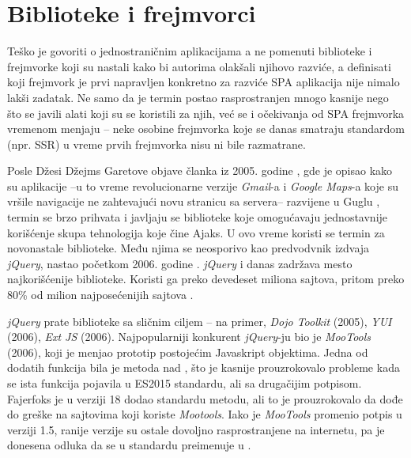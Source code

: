 \section{Biblioteke i frejmvorci}

Teško je govoriti o jednostraničnim aplikacijama a ne pomenuti biblioteke i frejmvorke koji su nastali kako bi autorima olakšali njihovo razviće, a definisati koji frejmvork je prvi napravljen konkretno za razviće SPA aplikacija nije nimalo lakši zadatak.
Ne samo da je termin  postao rasprostranjen mnogo kasnije nego što se javili alati koji su se koristili za njih, već se i očekivanja od SPA frejmvorka vremenom menjaju -- neke osobine frejmvorka koje se danas smatraju standardom (npr. SSR) u vreme prvih frejmvorka nisu ni bile razmatrane.

Posle Džesi Džejms Garetove objave članka iz 2005. godine \cite{ajax-a-new-approach}, gde je opisao kako su aplikacije --u to vreme revolucionarne verzije \textsl{Gmail}-a i \textsl{Google Maps}-a koje su vršile navigacije ne zahtevajući novu stranicu sa servera-- razvijene u Guglu \cite{aaronsw:ajax-history}, termin  se brzo prihvata i javljaju se biblioteke koje omogućavaju jednostavnije korišćenje skupa tehnologija koje čine Ajaks.
U ovo vreme koristi se termin  za novonastale biblioteke.
Među njima se neosporivo kao predvodvnik izdvaja \textsl{jQuery}, nastao početkom 2006. godine \cite{vincent:short-history}.
\textsl{jQuery} i danas zadržava mesto najkorišćenije biblioteke.
Koristi ga preko devedeset miliona sajtova, pritom preko 80\% od milion najposećenijih sajtova \cite{built-with-jquery}.

\textsl{jQuery} prate biblioteke sa sličnim ciljem -- na primer, \textsl{Dojo Toolkit} (2005), \textsl{YUI} (2006), \textsl{Ext JS} (2006).
Najpopularniji konkurent \textsl{jQuery}-ju bio je \textsl{MooTools} (2006), koji je menjao prototip postojećim Javaskript objektima.
Jedna od dodatih funkcija bila je metoda  nad , što je kasnije prouzrokovalo probleme kada se ista funkcija pojavila u ES2015 standardu, ali sa drugačijim potpisom.
Fajerfoks je u verziji 18 dodao standardu metodu, ali to je prouzrokovalo da dođe do greške na sajtovima koji koriste \textsl{Mootools}.
Iako je \textsl{MooTools} promenio potpis u verziji 1.5, ranije verzije su ostale dovoljno rasprostranjene na internetu, pa je donesena odluka da se  u standardu preimenuje u  \cite{mdn:string-includes}.

